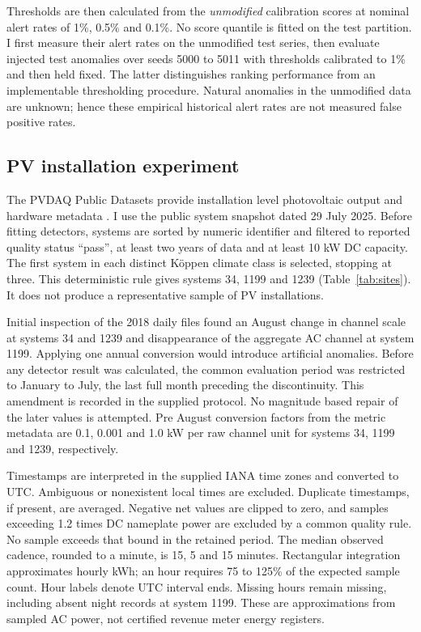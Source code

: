 \documentclass[11pt,a4paper]{article}
\begin{document}
Thresholds are then calculated from the \emph{unmodified} calibration scores at nominal alert rates of 1\%, 0.5\% and 0.1\%. No score quantile is fitted on the test partition. I first measure their alert rates on the unmodified test series, then evaluate injected test anomalies over seeds 5000 to 5011 with thresholds calibrated to 1\% and then held fixed. The latter distinguishes ranking performance from an implementable thresholding procedure. Natural anomalies in the unmodified data are unknown; hence these empirical historical alert rates are not measured false positive rates.

\subsection{PV installation experiment}\label{sec:sites}
The PVDAQ Public Datasets provide installation level photovoltaic output and hardware metadata \cite{pvdaq}. I use the public system snapshot dated 29 July 2025. Before fitting detectors, systems are sorted by numeric identifier and filtered to reported quality status ``pass'', at least two years of data and at least 10 kW DC capacity. The first system in each distinct K\"oppen climate class is selected, stopping at three. This deterministic rule gives systems 34, 1199 and 1239 (Table~\ref{tab:sites}). It does not produce a representative sample of PV installations.

Initial inspection of the 2018 daily files found an August change in channel scale at systems 34 and 1239 and disappearance of the aggregate AC channel at system 1199. Applying one annual conversion would introduce artificial anomalies. Before any detector result was calculated, the common evaluation period was restricted to January to July, the last full month preceding the discontinuity. This amendment is recorded in the supplied protocol. No magnitude based repair of the later values is attempted. Pre August conversion factors from the metric metadata are 0.1, 0.001 and 1.0 kW per raw channel unit for systems 34, 1199 and 1239, respectively.

Timestamps are interpreted in the supplied IANA time zones and converted to UTC. Ambiguous or nonexistent local times are excluded. Duplicate timestamps, if present, are averaged. Negative net values are clipped to zero, and samples exceeding 1.2 times DC nameplate power are excluded by a common quality rule. No sample exceeds that bound in the retained period. The median observed cadence, rounded to a minute, is 15, 5 and 15 minutes. Rectangular integration approximates hourly kWh; an hour requires 75 to 125\% of the expected sample count. Hour labels denote UTC interval ends. Missing hours remain missing, including absent night records at system 1199. These are approximations from sampled AC power, not certified revenue meter energy registers.
\end{document}
